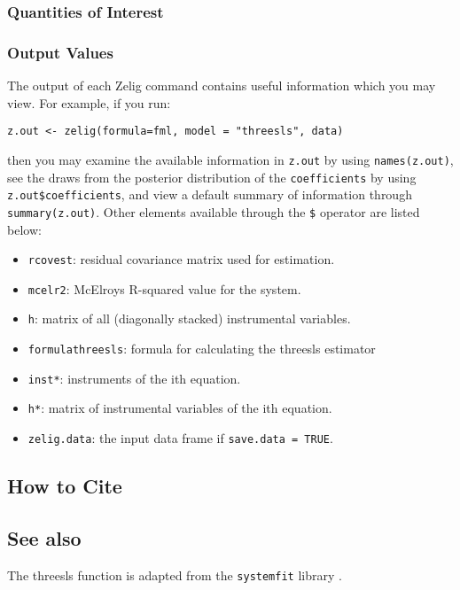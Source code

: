 \subsubsection{Quantities of Interest}
\subsubsection{Output Values}
The output of each Zelig command contains useful information which you may
view. For example, if you run:
\begin{verbatim}
z.out <- zelig(formula=fml, model = "threesls", data)
\end{verbatim}
\noindent then you may examine the available information in \texttt{z.out} by
using \texttt{names(z.out)}, see the draws from the posterior distribution of
the \texttt{coefficients} by using \texttt{z.out\$coefficients}, and view a default
summary of information through \texttt{summary(z.out)}. Other elements
available through the \texttt{\$} operator are listed below:
\begin{itemize}
\item \texttt{rcovest}: residual covariance matrix used for estimation.
\item \texttt{mcelr2}: McElroys R-squared value for the system.
\item \texttt{h}: matrix of all (diagonally stacked) instrumental variables.
\item \texttt{formulathreesls}: formula for calculating the threesls estimator 

\end{itemize}

\begin{itemize}
\item \texttt{inst*}: instruments of the ith equation.
\item \texttt{h*}: matrix of instrumental variables of the ith equation. 
   \item {\tt zelig.data}: the input data frame if {\tt save.data = TRUE}.  
\end{itemize}

\subsection* {How to Cite} 




\subsection* {See also}
The threesls function is adapted from the \texttt{systemfit} library
\citep{HamHen05}.

